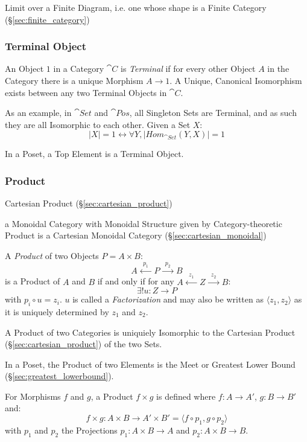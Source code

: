 Limit over a Finite Diagram, i.e. one whose shape is a Finite Category
(\S\ref{sec:finite_category})



\subsubsection{Terminal Object}\label{sec:terminal_object}

An Object $1$ in a Category $\cat{C}$ is \emph{Terminal} if for
every other Object $A$ in the Category there is a unique Morphism $A
\rightarrow 1$. A Unique, Canonical Isomorphism exists between any two
Terminal Objects in $\cat{C}$.

As an example, in $\cat{Set}$ and $\cat{Pos}$, all Singleton
Sets are Terminal, and as such they are all Isomorphic to each other.
Given a Set $X$:
\[
  |X| = 1 \leftrightarrow \forall Y, |Hom_{\cat{Set}}(Y,X)| = 1
\]

In a Poset, a Top Element is a Terminal Object.



\subsubsection{Product}\label{sec:product}

\fist Cartesian Product (\S\ref{sec:cartesian_product})

a Monoidal Category with Monoidal Structure given by Category-theoretic Product
is a Cartesian Monoidal Category (\S\ref{sec:cartesian_monoidal})

A \emph{Product} of two Objects $P = A \times B$:
\[
  A \xleftarrow{\;\;p_1\;\;} P \xrightarrow{\;\;p_2\;\;} B
\]
is a Product of $A$ and $B$ if and only if for any $A
\xleftarrow{\;\;z_1\;\;} Z \xrightarrow{\;\;z_2\;\;} B$:
\[
  \exists!u : Z \rightarrow P
\]
with $p_i \circ u = z_i$. $u$ is called a \emph{Factorization} and may
also be written as $\langle z_1, z_2 \rangle$ as it is uniquely
determined by $z_1$ and $z_2$.

A Product of two Categories is uniquiely Isomorphic to the Cartesian
Product (\S\ref{sec:cartesian_product}) of the two Sets.

In a Poset, the Product of two Elements is the Meet or Greatest Lower
Bound (\S\ref{sec:greatest_lowerbound}).

For Morphisms $f$ and $g$, a Product $f \times g$ is defined where $f
: A \rightarrow A'$, $g : B \rightarrow B'$ and:
\[
  f \times g : A \times B \rightarrow A' \times B' =
  \langle f \circ p_1, g \circ p_2 \rangle
\]
with $p_1$ and $p_2$ the Projections $p_1 : A \times B \rightarrow A$
and $p_2 : A \times B \rightarrow B$.

